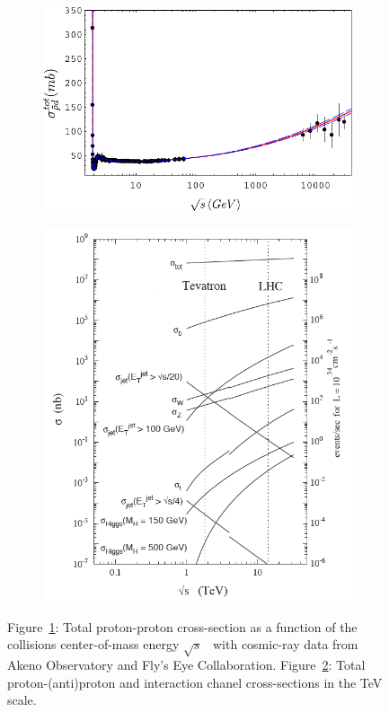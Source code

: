 	\begin{figure}[H]
		\begin{subfigure}{0.4\linewidth}
			\centering
			\includegraphics[width=0.55\plotwidth]{fig/chapt2/pp-total-cross-section.pdf}
			\caption{\label{fig:pp-cross-section:A}}
		\end{subfigure}
		\begin{subfigure}{0.6\linewidth}
			\centering
			\includegraphics[width=0.65\plotwidth]{fig/chapt2/Cross-sections.png}
			\caption{\label{fig:pp-cross-section:B}}
		\end{subfigure}
		\caption{\label{fig:pp-cross-section} Figure~\ref{fig:pp-cross-section:A}: Total proton-proton cross-section as a function of the collisions center-of-mass energy $\sqrt{s}$~\cite{ARKHIPOV2001} with cosmic-ray data from Akeno Observatory and Fly’s Eye Collaboration.  Figure~\ref{fig:pp-cross-section:B}: Total proton-(anti)proton and interaction chanel cross-sections in the \si{TeV} scale.}
	\end{figure}
	
